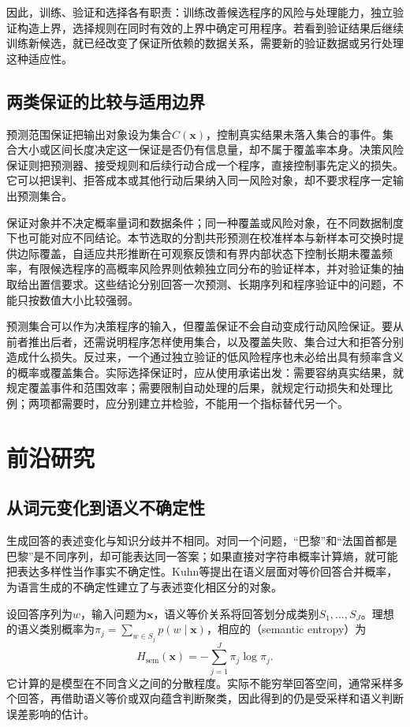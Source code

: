 因此，训练、验证和选择各有职责：训练改善候选程序的风险与处理能力，独立验证构造上界，选择规则在同时有效的上界中确定可用程序。若看到验证结果后继续训练新候选，就已经改变了保证所依赖的数据关系，需要新的验证数据或另行处理这种适应性。

\subsection{两类保证的比较与适用边界}

预测范围保证把输出对象设为集合$C(\bm{x})$，控制真实结果未落入集合的事件。集合大小或区间长度决定这一保证是否仍有信息量，却不属于覆盖率本身。决策风险保证则把预测器、接受规则和后续行动合成一个程序，直接控制事先定义的损失。它可以把误判、拒答成本或其他行动后果纳入同一风险对象，却不要求程序一定输出预测集合。

保证对象并不决定概率量词和数据条件；同一种覆盖或风险对象，在不同数据制度下也可能对应不同结论。本节选取的分割共形预测在校准样本与新样本可交换时提供边际覆盖，自适应共形推断在可观察反馈和有界内部状态下控制长期未覆盖频率，有限候选程序的高概率风险界则依赖独立同分布的验证样本，并对验证集的抽取给出置信要求。这些结论分别回答一次预测、长期序列和程序验证中的问题，不能只按数值大小比较强弱。

预测集合可以作为决策程序的输入，但覆盖保证不会自动变成行动风险保证。要从前者推出后者，还需说明程序怎样使用集合，以及覆盖失败、集合过大和拒答分别造成什么损失。反过来，一个通过独立验证的低风险程序也未必给出具有频率含义的概率或覆盖集合。实际选择保证时，应从使用承诺出发：需要容纳真实结果，就规定覆盖事件和范围效率；需要限制自动处理的后果，就规定行动损失和处理比例；两项都需要时，应分别建立并检验，不能用一个指标替代另一个。

\section{前沿研究}
\label{sec:reliability-frontiers}

\subsection{从词元变化到语义不确定性}

生成回答的表述变化与知识分歧并不相同。对同一个问题，“巴黎”和“法国首都是巴黎”是不同序列，却可能表达同一答案；如果直接对字符串概率计算熵，就可能把表达多样性当作事实不确定性。Kuhn等提出在语义层面对等价回答合并概率，为语言生成的不确定性建立了与表述变化相区分的对象。

设回答序列为$w$，输入问题为$\bm{x}$，语义等价关系将回答划分成类别$S_1,\ldots,S_J$。理想的语义类别概率为$\pi_j=\sum_{w\in S_j}p(w\mid\bm{x})$，相应的（semantic entropy）为
\begin{equation}
 H_{\mathrm{sem}}(\bm{x})=-\sum_{j=1}^{J}\pi_j\log \pi_j.
 \label{eq:reliability-semantic-entropy}
\end{equation}
它计算的是模型在不同含义之间的分散程度。实际不能穷举回答空间，通常采样多个回答，再借助语义等价或双向蕴含判断聚类，因此得到的仍是受采样和语义判断误差影响的估计。

